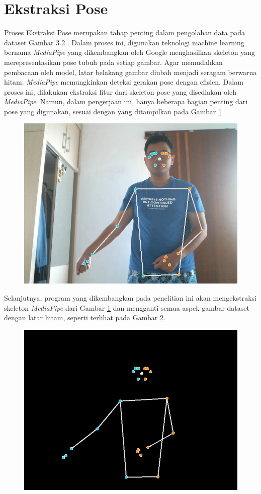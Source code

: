 \section{Ekstraksi Pose}
Proses Ekstraksi Pose merupakan tahap penting dalam pengolahan data pada dataset Gambar 3.2 . Dalam proses ini, digunakan teknologi machine learning bernama \textit{MediaPipe} yang dikembangkan oleh Google menghasilkan skeleton yang merepresentasikan pose tubuh pada setiap gambar. Agar memudahkan pembacaan oleh model, latar belakang gambar diubah menjadi seragam berwarna hitam. \textit{MediaPipe} memungkinkan deteksi gerakan pose dengan efisien. Dalam proses ini, dilakukan ekstraksi fitur dari skeleton pose yang disediakan oleh \textit{MediaPipe}. Namun, dalam pengerjaan ini, hanya beberapa bagian penting dari  pose yang digunakan, sesuai dengan yang ditampilkan pada Gambar \ref{fig:CITRAAWAL1}
\begin{figure}[hbt!]
	\includegraphics[width=0.7\linewidth]{gambar/Gambar3.3.png}
	\label{fig:CITRAAWAL1}
\end{figure}
Selanjutnya, program yang dikembangkan pada penelitian ini akan mengekstraksi skeleton \textit{MediaPipe} dari Gambar \ref{fig:CITRAAWAL1} dan mengganti semua aspek gambar dataset dengan latar hitam, seperti terlihat pada Gambar \ref{fig:CITRAAKHIR1}.
\begin{figure}[hbt!]
	\includegraphics[width=0.7\linewidth]{gambar/Gambar3.4.jpg}
	\label{fig:CITRAAKHIR1}
\end{figure}
